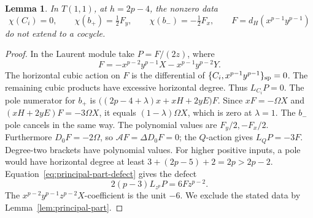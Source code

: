 \documentclass[11pt]{article}
\theoremstyle{plain}
\newtheorem{lemma}[lemma]{Lemma}
\theoremstyle{definition}
\theoremstyle{remark}
\numberwithin{equation}{section}
\begin{document}
\begin{lemma}\label{lem:gradient-pole}
In \(T(1,1)\), at \(h=2p-4\), the nonzero data
\[
 \chi(C_i)=0,\qquad \chi(b_+)=\tfrac12F_y,\qquad
 \chi(b_-)=-\tfrac12F_x,\qquad
 F=d_H(x^{p-1}y^{p-1})
\]
do not extend to a cocycle.
\end{lemma}
\begin{proof}
In the Laurent module take \(P=F/(2z)\), where
\[
 F=-x^{p-2}y^{p-1}X-x^{p-1}y^{p-2}Y .
\]
The horizontal cubic action on \(F\) is the differential of
\(\{C_i,x^{p-1}y^{p-1}\}_{\rm sp}=0\).
The remaining cubic products have excessive horizontal degree.
Thus \(L_{C_i}P=0\).
The pole numerator for \(b_+\) is
\(\bigl((2p-4+\lambda)x+xH+2yE\bigr)F\).
Since \(xF=-\Omega X\) and \((xH+2yE)F=-3\Omega X\),
it equals \((1-\lambda)\Omega X\), which is zero at \(\lambda=1\).
The \(b_-\) pole cancels in the same way.
The polynomial values are \(F_y/2,-F_x/2\).
Furthermore \(D_0F=-2\Omega\), so \(\mathcal A F=\Delta D_0F=0\);
the \(Q\)-action gives \(L_QP=-3F\).
Degree-two brackets have polynomial values.
For higher positive inputs, a pole would have horizontal degree at
least \(3+(2p-5)+2=2p>2p-2\).
Equation~\eqref{eq:principal-part-defect} gives the defect
\[
 2(p-3)L_{z^p}P=6Fz^{p-2}.
\]
The \(x^{p-2}y^{p-1}z^{p-2}X\)-coefficient is the unit \(-6\).
We exclude the stated data by Lemma~\ref{lem:principal-part}.
\end{proof}
\end{document}

